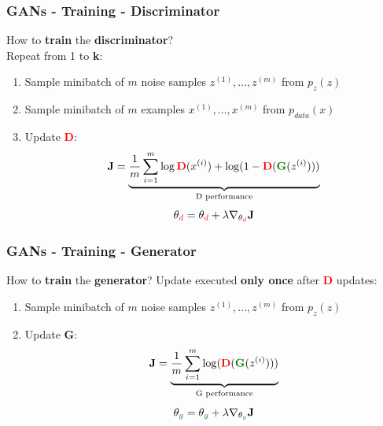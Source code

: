 \documentclass{beamer}
\begin{document}
\begin{frame}
	\frametitle{GANs - Training - Discriminator}
	How to \textbf{train} the \textbf{discriminator}? \\
	Repeat from 1 to \textbf{k}:
		\begin{enumerate}
			\item<1-> \alert<+>{Sample minibatch of $m$ noise samples ${z^{(1)},\dots,z^{(m)}}$ from $p_z(z)$}
			\item<2-> \alert<+>{Sample minibatch of $m$ examples ${x^{(1)},\dots,x^{(m)}}$ from $p_{data}(x)$}
			\item<3-> \alert<+>{Update \textcolor{red}{\textbf{D}}:
		\begin{equation*}
			\mathbf{J} =  \underbrace{\frac{1}{m} \sum_{i=1}^{m} \log \textcolor{red}{\mathbf{D}}(x^{(i)}) + \log(1 - \textcolor{red}{\mathbf{D}}(\textcolor{real}{\mathbf{G}}(z^{(i)})))}_{\text{D performance}}
		\end{equation*}
	\LARGE		
	\begin{equation*}
	\theta_{\textcolor{red}{d}} = \theta_{\textcolor{red}{d}} + \lambda \nabla_{\theta_{\textcolor{red}{d}}} \mathbf{J}
	\end{equation*}	
}
		\end{enumerate}
\end{frame}

\begin{frame}
	\frametitle{GANs - Training - Generator}
	How to \textbf{train} the \textbf{generator}? \newline
	Update executed \textbf{only once} after \textcolor{red}{\textbf{D}} updates:
	\begin{enumerate}
		\item<1-> \alert<+>{Sample minibatch of $m$ noise samples ${z^{(1)},\dots,z^{(m)}}$ from $p_z(z)$}
		\item<2-> \alert<+>{Update \textbf{\textcolor{real}{G}}:
			\begin{equation*}
			\mathbf{J} = \underbrace{\frac{1}{m} \sum_{i=1}^{m} \log( \textcolor{red}{\mathbf{D}}(\textcolor{real}{\mathbf{G}}(z^{(i)})))}_{\text{G performance}}
			\end{equation*}
			\LARGE
			\begin{equation*}
			\theta_{\textcolor{real}{g}} = \theta_{\textcolor{real}{g}}  + \lambda \nabla_{\theta_{\textcolor{real}{g}}} \mathbf{J}
			\end{equation*}
}
	\end{enumerate}
\end{frame} 
\end{document}
